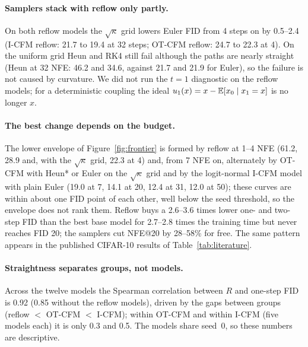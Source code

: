 \paragraph{Samplers stack with reflow only partly.} On both reflow models the $\sqrt\kappa$ grid lowers Euler FID from 4 steps on by 0.5--2.4 (I-CFM reflow: 21.7 to 19.4 at 32 steps; OT-CFM reflow: 24.7 to 22.3 at 4). On the uniform grid Heun and RK4 still fail although the paths are nearly straight (Heun at 32 NFE: 46.2 and 34.6, against 21.7 and 21.9 for Euler), so the failure is not caused by curvature. We did not run the $t=1$ diagnostic on the reflow models; for a deterministic coupling the ideal $u_1(x)=x-\mathbb{E}[x_0\mid x_1=x]$ is no longer $x$. %
\paragraph{The best change depends on the budget.} The lower envelope of Figure~\ref{fig:frontier} is formed by reflow at 1--4 NFE (61.2, 28.9 and, with the $\sqrt\kappa$ grid, 22.3 at 4) and, from 7 NFE on, alternately by OT-CFM with Heun* or Euler on the $\sqrt\kappa$ grid and by the logit-normal I-CFM model with plain Euler (19.0 at 7, 14.1 at 20, 12.4 at 31, 12.0 at 50); these curves are within about one FID point of each other, well below the seed threshold, so the envelope does not rank them. Reflow buys a 2.6--3.6 times lower one- and two-step FID than the best base model for 2.7--2.8 times the training time but never reaches FID 20; the samplers cut NFE@20 by 28--58\% for free. The same pattern appears in the published CIFAR-10 results of Table~\ref{tab:literature}.
\paragraph{Straightness separates groups, not models.} Across the twelve models the Spearman correlation between $R$ and one-step FID is 0.92 (0.85 without the reflow models), driven by the gaps between groups (reflow $<$ OT-CFM $<$ I-CFM); within OT-CFM and within I-CFM (five models each) it is only 0.3 and 0.5. The models share seed~0, so these numbers are descriptive.

